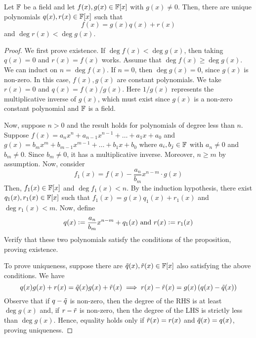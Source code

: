 \begin{prop} \label{prop:div_algo_fields}
    Let $\mathbb{F}$ be a field and let $f(x), g(x) \in \mathbb{F}[x]$ with $g(x) \neq 0$. Then, there are unique polynomials $q(x), r(x) \in \mathbb{F}[x]$ such that 
    \[
        f(x) = g(x)q(x) + r(x)
    \]
    and $\deg r(x) < \deg g(x)$.
\end{prop}
\begin{proof}
    We first prove existence. If $\deg f(x) < \deg g(x)$, then taking $q(x) = 0$ and $r(x) = f(x)$ works. Assume that $\deg f(x) \geq \deg g(x)$. We can induct on $n = \deg f(x)$. If $n=0$, then $\deg g(x) = 0$, since $g(x)$ is non-zero. In this case, $f(x),g(x)$ are constant polynomials. We take $r(x) = 0$ and $q(x) = f(x)/g(x)$. Here $1/g(x)$ represents the multiplicative inverse of $g(x)$, which must exist since $g(x)$ is a non-zero constant polynomial and $\mathbb{F}$ is a field. 
    
    \medskip
    
    Now, suppose $n > 0$ and the result holds for polynomials of degree less than $n$. Suppose $f(x) = a_nx^n + a_{n-1}x^{n-1} + \ldots + a_1x + a_0$ and $g(x) = b_mx^m + b_{m-1}x^{m-1} + \ldots + b_1x + b_0$ where $a_i,b_j \in \mathbb{F}$ with $a_n \neq 0$ and $b_m \neq 0$. Since $b_m \neq 0$, it has a multiplicative inverse. Moreover, $n \geq m$ by assumption. Now, consider
    \[
        f_1(x) = f(x) - \frac{a_n}{b_m} x^{n-m} \cdot g(x)
    \]
    Then, $f_1(x) \in \mathbb{F}[x]$ and $\deg f_1(x) < n$. By the induction hypothesis, there exist $q_1(x), r_1(x) \in \mathbb{F}[x]$ such that $f_1(x) = g(x)q_1(x) + r_1(x)$ and $\deg r_1(x) < m$. Now, define
    \[
        q(x) \vcentcolon= \frac{a_n}{b_m} x^{n-m} + q_1(x) \text{  and  } r(x) \vcentcolon= r_1(x)
    \]
    Verify that these two polynomials satisfy the conditions of the proposition, proving existence.
    
    \medskip
    
    To prove uniqueness, suppose there are $\Tilde{q}(x), \Tilde{r}(x) \in \mathbb{F}[x]$ also satisfying the above conditions. We have
    \[
        q(x)g(x) + r(x) = \Tilde{q}(x)g(x) + \Tilde{r}(x) \implies r(x) - \Tilde{r}(x) = g(x) \left( q(x) - \Tilde{q}(x) \right)
    \]
    Observe that if $q-\Tilde{q}$ is non-zero, then the degree of the RHS is at least $\deg g(x)$ and, if $r-\Tilde{r}$ is non-zero, then the degree of the LHS is strictly less than $\deg g(x)$. Hence, equality holds only if $\Tilde{r}(x) = r(x)$ and $\Tilde{q}(x) = q(x)$, proving uniqueness.
\end{proof}

